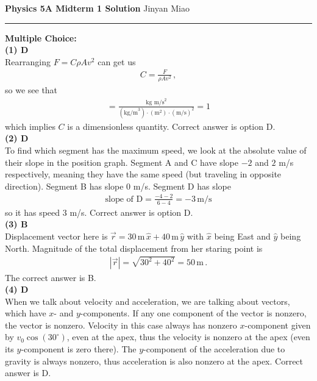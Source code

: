 \documentclass[11pt, onesided]{book}
\theoremstyle{break}
\theoremstyle{break}
\begin{document}
\noindent \textbf{Physics 5A Midterm 1 Solution} \hfill Jinyan Miao\\
\rule[0.25cm]{8cm}{0.4pt}

\noindent \textbf{Multiple Choice:}\\

\noindent \textbf{(1) D}\\
Rearranging $F = C\rho Av^2$ can get us
\begin{align*}
C = \frac{F}{\rho Av^2}\,,
\end{align*}
so we see that
\begin{align*}
[C] = \frac{\text{kg m/s}^2}{(\text{kg/m}^3) \cdot (\text{m}^2) \cdot (\text{m/s})^2} = 1
\end{align*}
which implies $C$ is a dimensionless quantity. Correct answer is option D.\\


\noindent \textbf{(2) D}\\
To find which segment has the maximum speed, we look at the absolute value of their slope in the position graph. Segment A and C have slope $-2$ and $2$ m/s respectively, meaning they have the same speed (but traveling in opposite direction). Segment B has slope $0$ m/s. Segment D has slope 
\begin{align*}
\text{slope of D} = \frac{-4-2}{6-4} = -3\,\text{m/s}
\end{align*}
so it has speed $3$ m/s. Correct answer is option D.\\


\noindent \textbf{(3) B}\\
Displacement vector here is $\vec{r} = 30\,\text{m}\,\hat{x} + 40\,\text{m}\, \hat{y}$ with $\hat{x}$ being East and $\hat{y}$ being North. Magnitude of the total displacement from her staring point is 
\begin{align*}
|\vec{r}| = \sqrt{30^2 + 40^2} = 50\,\text{m}\,.
\end{align*}
The correct answer is B.\\

\noindent \textbf{(4) D}\\
When we talk about velocity and acceleration, we are talking about vectors, which have $x$- and $y$-components. If any one component of the vector is nonzero, the vector is nonzero. Velocity in this case always has nonzero $x$-component given by $v_0 \cos(30^\circ)$, even at the apex, thus the velocity is nonzero at the apex (even its $y$-component is zero there). The $y$-component of the acceleration due to gravity is always nonzero, thus acceleration is also nonzero at the apex. Correct answer is D.\\
\end{document}
